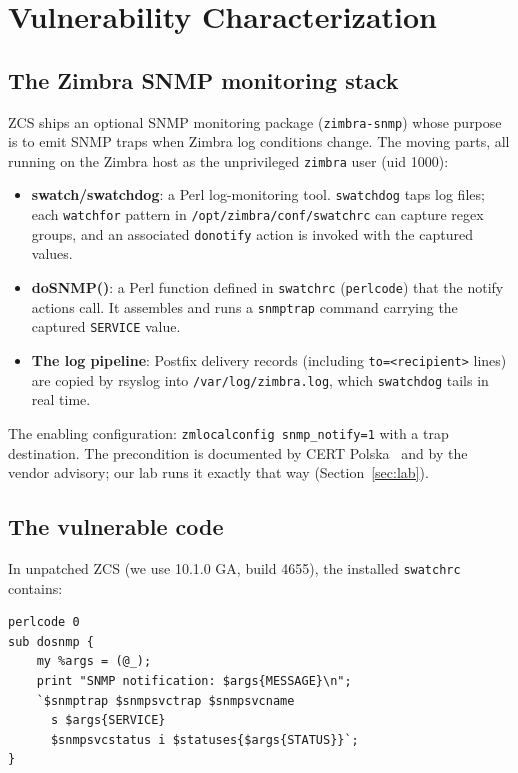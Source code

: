 \documentclass[journal]{IEEEtran}
\begin{document}
\section{Vulnerability Characterization}
\label{sec:vuln}

\subsection{The Zimbra SNMP monitoring stack}

ZCS ships an optional SNMP monitoring package (\texttt{zimbra-snmp}) whose
purpose is to emit SNMP traps when Zimbra log conditions change. The moving
parts, all running on the Zimbra host as the unprivileged \texttt{zimbra}
user (uid 1000):

\begin{itemize}
\item \textbf{swatch/swatchdog}: a Perl log-monitoring tool. \texttt{swatchdog}
taps log files; each \texttt{watchfor} pattern in
\texttt{/opt/zimbra/conf/swatchrc} can capture regex groups, and an
associated \texttt{donotify} action is invoked with the captured values.
\item \textbf{doSNMP()}: a Perl function defined in \texttt{swatchrc}
(\texttt{perlcode}) that the notify actions call. It assembles and runs a
\texttt{snmptrap} command carrying the captured \texttt{SERVICE} value.
\item \textbf{The log pipeline}: Postfix delivery records (including
\texttt{to=<recipient>} lines) are copied by rsyslog into
\texttt{/var/log/zimbra.log}, which \texttt{swatchdog} tails in real time.
\end{itemize}

The enabling configuration: \texttt{zmlocalconfig snmp\_notify=1} with a
trap destination. The precondition is documented by CERT
Polska~\cite{certpolska} and by the vendor advisory; our lab runs it exactly
that way (Section~\ref{sec:lab}).

\subsection{The vulnerable code}

In unpatched ZCS (we use 10.1.0 GA, build 4655), the installed
\texttt{swatchrc} contains:

\begin{lstlisting}[style=perl,caption={Vulnerable doSNMP() (ZCS 10.1.0, /opt/zimbra/conf/swatchrc)}]
perlcode 0
sub dosnmp {
    my %args = (@_);
    print "SNMP notification: $args{MESSAGE}\n";
    `$snmptrap $snmpsvctrap $snmpsvcname
      s $args{SERVICE}
      $snmpsvcstatus i $statuses{$args{STATUS}}`;
}
\end{lstlisting}
\end{document}
